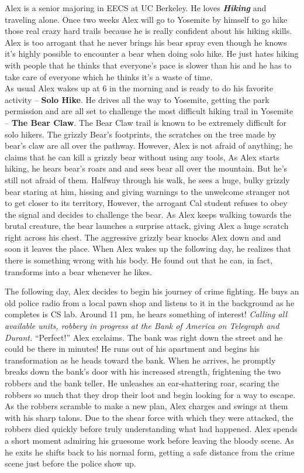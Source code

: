\documentclass{article}
\begin{document}
Alex is a senior majoring in EECS at UC Berkeley. He loves \textbf{\textit{Hiking}} and traveling alone. Once two weeks Alex will go to Yosemite by himself to go hike those real crazy hard trails because he is really confident about his hiking skills. Alex is too arrogant that he never brings his bear spray even though he knows it’s highly possible to encounter a bear when doing solo hike. He just hates hiking with people that he thinks that everyone’s pace is slower than his and he has to take care of everyone which he thinks it's a waste of time. \\
\newline
	\indent As usual Alex wakes up at 6 in the morning and is ready to do his favorite activity -- \textbf{Solo Hike}. He drives all the way to Yosemite, getting the park permission and are all set to challenge the most difficult hiking trail in Yosemite -- \textbf{The Bear Claw}. The Bear Claw trail is known to be extremely difficult for solo hikers. The grizzly Bear’s footprints, the scratches on the tree made by bear’s claw are all over the pathway. However, Alex is not afraid of anything; he claims that he can kill a grizzly bear without using any tools, As Alex starts hiking, he hears bear’s roars and and sees bear all over the mountain. But he’s still not afraid of them. Halfway through his walk, he sees a huge, bulky grizzly bear staring at him, hissing and giving warnings to the unwelcome stranger not to get closer to its territory, However, the arrogant Cal student refuses to obey the signal and decides to challenge the bear. As Alex keeps walking towards the brutal creature, the bear launches a surprise attack, giving Alex a huge scratch right across his chest. The aggressive grizzly bear knocks Alex down and and soon it leaves the place. When Alex wakes up the following day, he realizes that there is something wrong with his body. He found out that he can, in fact, transforms into a bear whenever he likes.

The following day, Alex decides to begin his journey of crime fighting. He buys an old police radio from a local pawn shop and listens to it in the background as he completes is CS lab. Around 11 pm, he hears something of interest! \textit{Calling all available units, robbery in progress at the Bank of America on Telegraph and Durant.} “Perfect!” Alex exclaims. The bank was right down the street and he could be there in minutes! He runs out of his apartment and begins his transformation as he heads toward the bank. When he arrives, he promptly breaks down the bank’s door with his increased strength, frightening the two robbers and the bank teller. He unleashes an ear-shattering roar, scaring the robbers so much that they drop their loot and begin looking for a way to escape. As the robbers scramble to make a new plan, Alex charges and swings at them with his sharp talons. Due to the shear force with which they were attacked, the robbers died quickly before truly understanding what had happened. Alex spends a short moment admiring his gruesome work before leaving the bloody scene. As he exits he shifts back to his normal form, getting a safe distance from the crime scene just before the police show up. 
\end{document}
